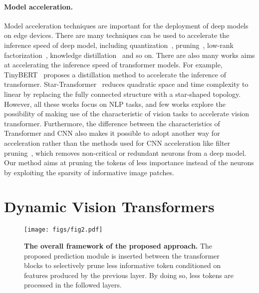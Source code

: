 \documentclass{article}
\begin{document}
\paragraph{Model acceleration. }
Model acceleration techniques are important for the deployment of deep models on edge devices. There are many techniques can be used to accelerate the inference speed of deep model, including quantization~\cite{gong2014compressing, wang2019haq}, pruning~\cite{he2017channel, rao2018runtime}, low-rank factorization~\cite{yu2017compressing}, knowledge distillation~\cite{hinton2015distilling, liu2020metadistiller} and so on. There are also many works aims at accelerating the inference speed of transformer models. For example, TinyBERT~\cite{jiao2019tinybert} proposes a distillation method to accelerate the inference of transformer. Star-Transformer~\cite{guo2019star} reduces quadratic space and time complexity to linear by replacing the fully connected structure with a star-shaped topology. However, all these works focus on NLP tasks, and few works explore the possibility of making use of the characteristic of vision tasks to accelerate vision transformer. Furthermore, the difference between the characteristics of Transformer and CNN also makes it possible to adopt another way for acceleration rather than the methods used for CNN acceleration like filter pruning~\cite{he2017channel}, which removes non-critical or redundant neurons from a deep model. Our method aims at pruning the tokens of less importance instead of the neurons by exploiting the sparsity of informative image patches.

\section{Dynamic Vision Transformers}

\begin{figure}[t]
    \centering
    \texttt{[image: figs/fig2.pdf]}
    \caption{\textbf{The overall framework of the proposed approach.} The proposed prediction module is inserted between the transformer blocks to selectively prune less informative token conditioned on features produced by the previous layer. By doing so, less tokens are processed in the followed layers. }
    \label{fig:overall}
\end{figure}
\end{document}
